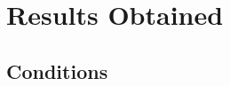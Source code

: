 \documentclass{article}
\begin{document}





\section{Results Obtained}
\subsection{Conditions}
\end{document}
